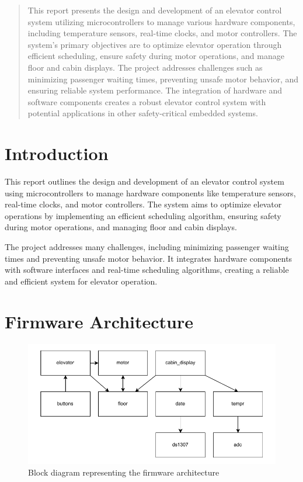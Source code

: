 \documentclass[12pt, a4paper]{report}
\begin{document}


\tableofcontents

\newpage
{}

\begin{abstract}
    This report presents the design and development of an elevator control system utilizing microcontrollers to manage various hardware components, including temperature sensors, real-time clocks, and motor controllers. The system's primary objectives are to optimize elevator operation through efficient scheduling, ensure safety during motor operations, and manage floor and cabin displays. The project addresses challenges such as minimizing passenger waiting times, preventing unsafe motor behavior, and ensuring reliable system performance. The integration of hardware and software components creates a robust elevator control system with potential applications in other safety-critical embedded systems.
\end{abstract}

\chapter{Introduction}

This report outlines the design and development of an elevator control system using microcontrollers to manage hardware components like temperature sensors, real-time clocks, and motor controllers. The system aims to optimize elevator operations by implementing an efficient scheduling algorithm, ensuring safety during motor operations, and managing floor and cabin displays.

The project addresses many challenges, including minimizing passenger waiting times and preventing unsafe motor behavior. It integrates hardware components with software interfaces and real-time scheduling algorithms, creating a reliable and efficient system for elevator operation.

\chapter{Firmware Architecture}

\begin{figure}[ht]
    \centering
    \includegraphics[width=\textwidth]{assets/block-diagram.pdf}
    \caption{Block diagram representing the firmware architecture}
\end{figure}
\end{document}
